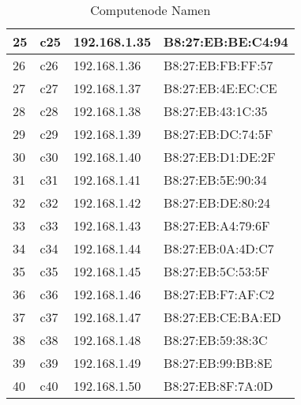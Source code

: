 \begin{table}[H]
\begin{tabular}{p{1cm}p{2cm}p{6cm}p{6cm}}
25 & c25 & 192.168.1.35 & B8:27:EB:BE:C4:94\\\hline
26 & c26 & 192.168.1.36 & B8:27:EB:FB:FF:57\\\hline
27 & c27 & 192.168.1.37 & B8:27:EB:4E:EC:CE\\\hline
28 & c28 & 192.168.1.38 & B8:27:EB:43:1C:35\\\hline
29 & c29 & 192.168.1.39 & B8:27:EB:DC:74:5F\\\hline
30 & c30 & 192.168.1.40 & B8:27:EB:D1:DE:2F\\\hline
31 & c31 & 192.168.1.41 & B8:27:EB:5E:90:34\\\hline
32 & c32 & 192.168.1.42 & B8:27:EB:DE:80:24\\\hline
33 & c33 & 192.168.1.43 & B8:27:EB:A4:79:6F\\\hline
34 & c34 & 192.168.1.44 & B8:27:EB:0A:4D:C7\\\hline
35 & c35 & 192.168.1.45 & B8:27:EB:5C:53:5F\\\hline
36 & c36 & 192.168.1.46 & B8:27:EB:F7:AF:C2\\\hline
37 & c37 & 192.168.1.47 & B8:27:EB:CE:BA:ED\\\hline
38 & c38 & 192.168.1.48 & B8:27:EB:59:38:3C\\\hline
39 & c39 & 192.168.1.49 & B8:27:EB:99:BB:8E\\\hline
40 & c40 & 192.168.1.50 & B8:27:EB:8F:7A:0D\\\hline
\end{tabular}
\caption{Computenode Namen}
\end{table}
